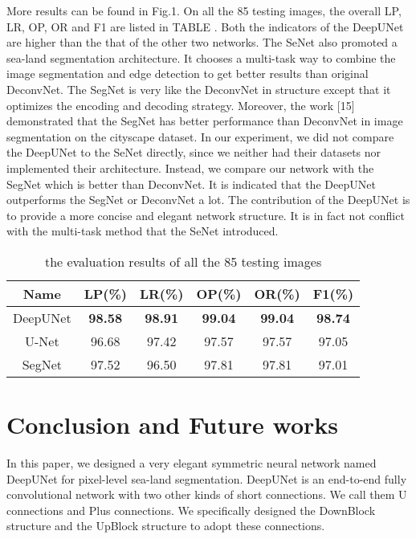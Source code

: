 \documentclass[conference]{IEEEtran}
\begin{document}
More results can be found in Fig.1. On all the 85 testing images, the overall LP, LR, OP, OR and F1 are listed in TABLE \uppercase\expandafter{}. Both the indicators of the DeepUNet are higher than the that of the other two networks. The SeNet also promoted a sea-land segmentation architecture. It chooses a multi-task way to combine the image segmentation and edge detection to get better results than original DeconvNet. The SegNet is very like the DeconvNet in structure except  that it optimizes the encoding and decoding strategy. Moreover, the work [15] demonstrated that the SegNet has better performance than DeconvNet in image segmentation on the cityscape dataset. In our experiment, we did not compare the DeepUNet to the SeNet directly, since we neither had their datasets nor implemented their architecture. Instead, we compare our network with the SegNet which is better than DeconvNet. It is indicated that the DeepUNet outperforms the SegNet or DeconvNet a lot.  The contribution of the DeepUNet is to provide a more concise and elegant network structure. It is in fact not conflict with the multi-task method that the SeNet introduced.

\begin{table}[h]
\centering
\caption{the evaluation results of all the 85 testing images}
\begin{tabular}{|c|c|c|c|c|c|}
\hline
Name & LP(\%) & LR(\%) & OP(\%) & OR(\%) & F1(\%) \\
\hline
DeepUNet & \textbf{98.58} & \textbf{98.91} & \textbf{99.04} & \textbf{99.04} & \textbf{98.74} \\
\hline
U-Net & 96.68 & 97.42 & 97.57 & 97.57 & 97.05 \\
\hline
SegNet & 97.52 & 96.50 & 97.81 & 97.81 & 97.01 \\
\hline
\end{tabular}
\label{table6}
\end{table}

\section{Conclusion and Future works}
In this paper, we designed a very elegant symmetric neural network named DeepUNet for pixel-level sea-land segmentation. DeepUNet is an end-to-end fully convolutional network with two other kinds of short connections. We call them U connections and Plus connections.  We specifically designed the DownBlock structure and the UpBlock structure to adopt these connections. \\
\end{document}
